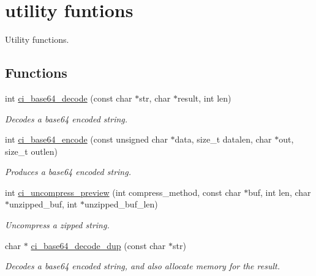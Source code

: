 \hypertarget{group__UTILITY}{
\section{utility funtions}
\label{group__UTILITY}
}


Utility functions.  
\subsection*{Functions}
\begin{DoxyCompactItemize}
\item 
int \hyperlink{group__UTILITY_gab3668540add9634ddb3c7b6ac7addd84}{ci\_\-base64\_\-decode} (const char $\ast$str, char $\ast$result, int len)
\begin{DoxyCompactList}\small\item\em Decodes a base64 encoded string. \item\end{DoxyCompactList}\item 
int \hyperlink{group__UTILITY_ga5230a54d10f5e53b3582f5d94f5bf92e}{ci\_\-base64\_\-encode} (const unsigned char $\ast$data, size\_\-t datalen, char $\ast$out, size\_\-t outlen)
\begin{DoxyCompactList}\small\item\em Produces a base64 encoded string. \item\end{DoxyCompactList}\item 
int \hyperlink{group__UTILITY_ga7c6d68ffa3a5633ae759988fedff787c}{ci\_\-uncompress\_\-preview} (int compress\_\-method, const char $\ast$buf, int len, char $\ast$unzipped\_\-buf, int $\ast$unzipped\_\-buf\_\-len)
\begin{DoxyCompactList}\small\item\em Uncompress a zipped string. \item\end{DoxyCompactList}\item 
char $\ast$ \hyperlink{group__UTILITY_ga3fd517c8b65291980d073ccaf1178cf5}{ci\_\-base64\_\-decode\_\-dup} (const char $\ast$str)
\begin{DoxyCompactList}\small\item\em Decodes a base64 encoded string, and also allocate memory for the result. \item\end{DoxyCompactList}\end{DoxyCompactItemize}


